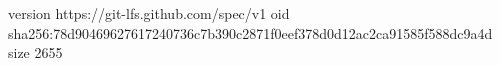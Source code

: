 version https://git-lfs.github.com/spec/v1
oid sha256:78d90469627617240736c7b390c2871f0eef378d0d12ac2ca91585f588dc9a4d
size 2655
